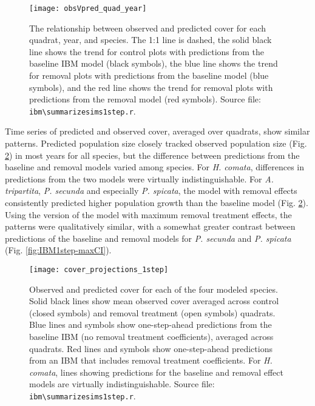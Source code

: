\documentclass[11pt]{article}
\begin{document}
\begin{doublespacing}
 \begin{figure}[tbp]
 \centering
 \texttt{[image: obsVpred\_quad\_year]}
 \caption{The relationship between observed and predicted cover for each quadrat, year, and species. The 1:1 line is dashed, the solid black line shows the trend for control plots with predictions from the baseline IBM model (black symbols), the blue line shows the trend for removal plots with predictions from the baseline model (blue symbols), and the red line shows the trend for removal plots with predictions from the removal model (red symbols). Source file: \texttt{ibm\textbackslash summarize\textunderscore sims1step.r}. }
 \label{fig:obsVpred}
 \end{figure}
 
Time series of predicted and observed cover, averaged over quadrats, show similar patterns. Predicted population size closely tracked observed population size (Fig. \ref{fig:IBM1step}) in most years for all species, but the difference between predictions from the baseline and removal models varied among species. For \textit{H. comata}, differences in predictions from the two models were virtually indistinguishable. For \textit{A. tripartita}, \textit{P. secunda} and especially \textit{P. spicata}, the model with removal effects consistently predicted higher population growth than the baseline model (Fig. \ref{fig:IBM1step}). Using the version of the model with maximum removal treatment effects, the patterns were qualitatively similar, with a somewhat greater contrast between predictions of the baseline and removal models for \textit{P. secunda} and \textit{P. spicata} (Fig. \ref{fig:IBM1step-maxCI}). 

 \begin{figure}[tbp]
 \centering
 \texttt{[image: cover\_projections\_1step]}
 \caption{Observed and predicted cover for each of the four modeled species. Solid black lines show mean observed cover averaged across control (closed symbols) and removal treatment (open symbols) quadrats. Blue lines and symbols show one-step-ahead predictions from the baseline IBM (no removal treatment coefficients), averaged across quadrats. Red lines and symbols show one-step-ahead predictions from an IBM that includes removal treatment coefficients. For \textit{H. comata}, lines showing predictions for the baseline and removal effect models are virtually indistinguishable. Source file: \texttt{ibm\textbackslash summarize\textunderscore sims1step.r}. }
 \label{fig:IBM1step}
 \end{figure}
 

\end{doublespacing}
\end{document}
